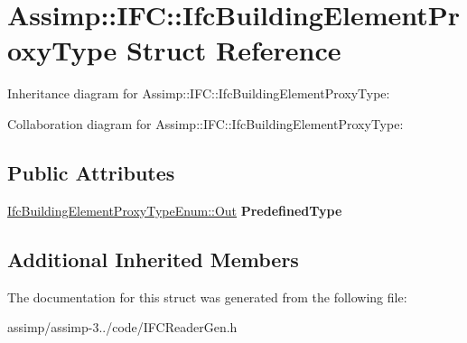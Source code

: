 \hypertarget{struct_assimp_1_1_i_f_c_1_1_ifc_building_element_proxy_type}{\section{Assimp\+:\+:I\+F\+C\+:\+:Ifc\+Building\+Element\+Proxy\+Type Struct Reference}
\label{struct_assimp_1_1_i_f_c_1_1_ifc_building_element_proxy_type}
}


Inheritance diagram for Assimp\+:\+:I\+F\+C\+:\+:Ifc\+Building\+Element\+Proxy\+Type\+:


Collaboration diagram for Assimp\+:\+:I\+F\+C\+:\+:Ifc\+Building\+Element\+Proxy\+Type\+:
\subsection*{Public Attributes}
\begin{DoxyCompactItemize}
\item 
\hypertarget{struct_assimp_1_1_i_f_c_1_1_ifc_building_element_proxy_type_a14c764fa5d557ca44a417b6dcc9f0107}{\hyperlink{classboost_1_1shared__ptr}{Ifc\+Building\+Element\+Proxy\+Type\+Enum\+::\+Out} {\bfseries Predefined\+Type}}\label{struct_assimp_1_1_i_f_c_1_1_ifc_building_element_proxy_type_a14c764fa5d557ca44a417b6dcc9f0107}

\end{DoxyCompactItemize}
\subsection*{Additional Inherited Members}


The documentation for this struct was generated from the following file\+:\begin{DoxyCompactItemize}
\item 
assimp/assimp-\/3../code/I\+F\+C\+Reader\+Gen.\+h\end{DoxyCompactItemize}
